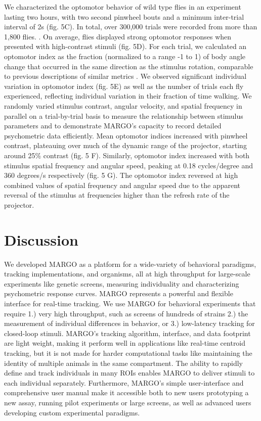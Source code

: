 \documentclass[10pt]{article}
\begin{document}
\begin{multicols}{2}
We characterized the optomotor behavior of wild type flies in an experiment lasting two hours, with two second pinwheel bouts and a minimum inter-trial interval of 2s (fig. 5C). In total, over 300,000 trials were recorded from more than 1,800 flies. . On average, flies displayed strong optomotor responses when presented with high-contrast stimuli (fig. 5D). For each trial, we calculated an optomotor index as the fraction (normalized to a range -1 to 1) of body angle change that occurred in the same direction as the stimulus rotation, comparable to previous descriptions of similar metrics \cite{Seelig_Two_2010}. We observed significant individual variation in optomotor index (fig. 5E) as well as the number of trials each fly experienced, reflecting individual variation in their fraction of time walking. We randomly varied stimulus contrast, angular velocity, and spatial frequency in parallel on a trial-by-trial basis to measure the relationship between stimulus parameters and to demonstrate MARGO's capacity to record detailed psychometric data efficiently. Mean optomotor indices increased with pinwheel contrast, plateauing over much of the dynamic range of the projector, starting around 25\% contrast (fig. 5 F). Similarly, optomotor index increased with both stimulus spatial frequency and angular speed, peaking at 0.18 cycles/degree and 360 degrees/s respectively (fig. 5 G). The optomotor index reversed at high combined values of spatial frequency and angular speed due to the apparent reversal of the stimulus at frequencies higher than the refresh rate of the projector.


\section*{Discussion}

We developed MARGO as a platform for a wide-variety of behavioral paradigms, tracking implementations, and organisms, all at high throughput for large-scale experiments like genetic screens, measuring individuality and characterizing psychometric response curves. MARGO represents a powerful and flexible interface for real-time tracking. We use MARGO for behavioral experiments that require 1.) very high throughput, such as screens of hundreds of strains 2.) the measurement of individual differences in behavior, or 3.) low-latency tracking for closed-loop stimuli. MARGO's tracking algorithm, interface, and data footprint are light weight, making it perform well in applications like real-time centroid tracking, but it is not made for harder computational tasks like maintaining the identity of multiple animals in the same compartment. The ability to rapidly define and track individuals in many ROIs enables MARGO to deliver stimuli to each individual separately. Furthermore, MARGO's simple user-interface and comprehensive user manual make it accessible both to new users prototyping a new assay, running pilot experiments or large screens, as well as advanced users developing custom experimental paradigms.


\end{multicols}
\end{document}
